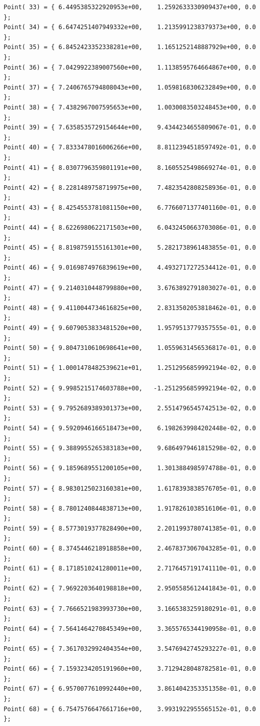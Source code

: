 \documentclass[12pt]{article}
\begin{document}
\begin{CJK}{UTF8}{gkai}
\begin{verbatim}
Point( 33) = { 6.4495385322920953e+00,    1.2592633330909437e+00, 0.0 };
Point( 34) = { 6.6474251407949332e+00,    1.2135991238379373e+00, 0.0 };
Point( 35) = { 6.8452423352338281e+00,    1.1651252148887929e+00, 0.0 };
Point( 36) = { 7.0429922389007560e+00,    1.1138595764664867e+00, 0.0 };
Point( 37) = { 7.2406765794808043e+00,    1.0598168306232849e+00, 0.0 };
Point( 38) = { 7.4382967007595653e+00,    1.0030083503248453e+00, 0.0 };
Point( 39) = { 7.6358535729154644e+00,    9.4344234655809067e-01, 0.0 };
Point( 40) = { 7.8333478016006266e+00,    8.8112394518597492e-01, 0.0 };
Point( 41) = { 8.0307796359801191e+00,    8.1605525498669274e-01, 0.0 };
Point( 42) = { 8.2281489758719975e+00,    7.4823542808258936e-01, 0.0 };
Point( 43) = { 8.4254553781081150e+00,    6.7766071377401160e-01, 0.0 };
Point( 44) = { 8.6226980622171503e+00,    6.0432450663703086e-01, 0.0 };
Point( 45) = { 8.8198759155161301e+00,    5.2821738961483855e-01, 0.0 };
Point( 46) = { 9.0169874976839619e+00,    4.4932717272534412e-01, 0.0 };
Point( 47) = { 9.2140310448799880e+00,    3.6763892791803027e-01, 0.0 };
Point( 48) = { 9.4110044734616825e+00,    2.8313502053818462e-01, 0.0 };
Point( 49) = { 9.6079053833481520e+00,    1.9579513779357555e-01, 0.0 };
Point( 50) = { 9.8047310610698641e+00,    1.0559631456536817e-01, 0.0 };
Point( 51) = { 1.0001478482539621e+01,    1.2512956859992194e-02, 0.0 };
Point( 52) = { 9.9985215174603788e+00,   -1.2512956859992194e-02, 0.0 };
Point( 53) = { 9.7952689389301373e+00,    2.5514796545742513e-02, 0.0 };
Point( 54) = { 9.5920946166518473e+00,    6.1982639984202448e-02, 0.0 };
Point( 55) = { 9.3889955265383183e+00,    9.6864979461815298e-02, 0.0 };
Point( 56) = { 9.1859689551200105e+00,    1.3013884985974788e-01, 0.0 };
Point( 57) = { 8.9830125023160381e+00,    1.6178393838576705e-01, 0.0 };
Point( 58) = { 8.7801240844838713e+00,    1.9178261038516106e-01, 0.0 };
Point( 59) = { 8.5773019377828490e+00,    2.2011993780741385e-01, 0.0 };
Point( 60) = { 8.3745446218918858e+00,    2.4678373067043285e-01, 0.0 };
Point( 61) = { 8.1718510241280011e+00,    2.7176457191741110e-01, 0.0 };
Point( 62) = { 7.9692203640198818e+00,    2.9505585612441843e-01, 0.0 };
Point( 63) = { 7.7666521983993730e+00,    3.1665383259180291e-01, 0.0 };
Point( 64) = { 7.5641464270845349e+00,    3.3655765344190958e-01, 0.0 };
Point( 65) = { 7.3617032992404354e+00,    3.5476942745293227e-01, 0.0 };
Point( 66) = { 7.1593234205191960e+00,    3.7129428048782581e-01, 0.0 };
Point( 67) = { 6.9570077610992440e+00,    3.8614042353351358e-01, 0.0 };
Point( 68) = { 6.7547576647661716e+00,    3.9931922955565152e-01, 0.0 };

\end{verbatim}
\end{CJK}
\end{document}
